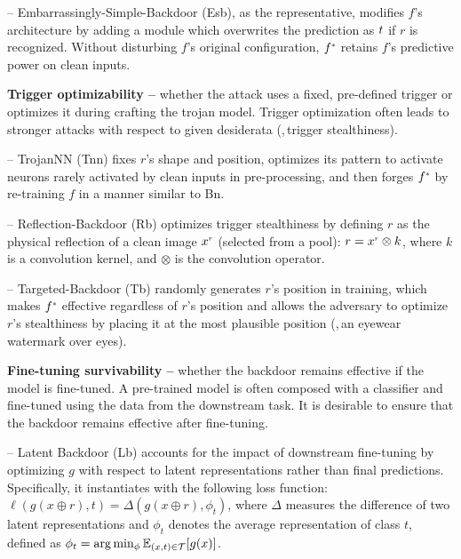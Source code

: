 \documentclass[compsoc,conference,a4paper,10pt,times]{IEEEtran}
\newcommand{\bn}{{\sc Bn}\xspace}
\newcommand{\tnn}{{\sc Tnn}\xspace}
\newcommand{\tb}{{\sc Tb}\xspace}
\newcommand{\lb}{{\sc Lb}\xspace}
\newcommand{\esb}{{\sc Esb}\xspace}
\newcommand{\rfb}{{\sc Rb}\xspace}
\begin{document}
-- Embarrassingly-Simple-Backdoor (\esb), as the representative, modifies $f$'s architecture by adding a module which overwrites the prediction as $t$ if $r$ is recognized. Without disturbing $f$'s original configuration, $\uf$ retains $f$'s predictive power on clean inputs.

\vspace{2pt}
{\bf Trigger optimizability --} whether the attack uses a fixed, pre-defined trigger or optimizes it during crafting the trojan model. Trigger optimization often leads to stronger attacks with respect to given desiderata (\meg,\,trigger stealthiness).

-- TrojanNN (\tnn) fixes $r$'s shape and position, optimizes its pattern to activate neurons rarely activated by clean inputs in pre-processing, and then forges $\uf$ by re-training $f$ in a manner similar to \bn.

-- Reflection-Backdoor (\rfb) optimizes trigger stealthiness by defining $r$ as the physical reflection of a clean image $\ssup{x}{r}$ (selected from a pool): $r = \ssup{x}{r} \otimes k$, where $k$ is a convolution kernel, and $\otimes$ is the convolution operator.

-- Targeted-Backdoor (\tb) randomly generates $r$'s position in training, which makes $\uf$ effective regardless of $r$'s position and allows the adversary to optimize $r$'s stealthiness by placing it at the most plausible position (\meg,\,an eyewear watermark over eyes).


\vspace{2pt}
{\bf Fine-tuning survivability --} whether the backdoor remains effective if the model is fine-tuned. A pre-trained model is often composed with a classifier and fine-tuned using the data from the downstream task. It is desirable to ensure that the backdoor remains effective after fine-tuning.

-- Latent Backdoor (\lb) accounts for the impact of downstream fine-tuning by optimizing $g$ with respect to latent representations rather than final predictions. Specifically, it instantiates  with the following loss function:
$\ell(g(x \oplus r), t) = \Delta(g(x \oplus r), \phi_t)$,
where $\Delta$ measures the difference of two latent representations and $\phi_t$ denotes the average representation of class $t$, defined as $\phi_t = \arg\min_{\phi} {\mathbb{E}}_{(x, t) \in \mathcal{T}} [g(x)] $.
\end{document}
